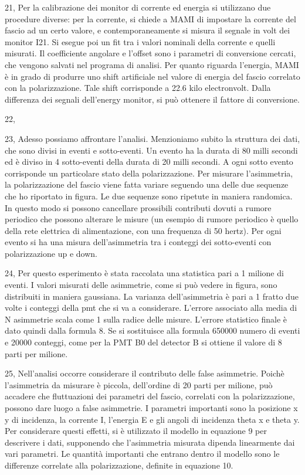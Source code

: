 \documentclass[11pt,a4paper]{article}
\begin{document}
\begin{list}{\textbf{slide}}{}
\item 21, Per la calibrazione dei monitor di corrente ed energia si utilizzano due procedure diverse: per la corrente, si chiede a MAMI di impostare la corrente del fascio ad un certo valore, e contemporaneamente si misura il segnale in volt dei monitor I21. Si esegue poi un fit tra i valori nominali della corrente e quelli misurati. Il coefficiente angolare e l'offset sono i parametri di conversione cercati, che vengono salvati nel programa di analisi. Per quanto riguarda l'energia, MAMI è in grado di produrre uno shift artificiale nel valore di energia del fascio correlato con la polarizzazione. Tale shift corrisponde a 22.6 kilo electronvolt. Dalla differenza dei segnali dell'energy monitor, si può ottenere il fattore di conversione.

\item 22,

\item 23, Adesso possiamo affrontare l'analisi. Menzioniamo subito la struttura dei dati, che sono divisi in eventi e sotto-eventi.  Un evento ha la durata di 80 milli secondi ed è diviso in 4 sotto-eventi della durata di 20 milli secondi. A ogni sotto evento corrisponde un particolare stato della polarizzazione. Per misurare l'asimmetria, la polarizzazione del fascio viene fatta variare seguendo una delle due sequenze che ho riportato in figura. Le due sequenze sono ripetute in maniera randomica. In questo modo si possono cancellare prossibili contributi dovuti a rumore periodico che possono alterare le misure (un esempio di rumore periodico è quello della rete elettrica di alimentazione, con una frequenza di 50 hertz). Per ogni evento si ha una misura dell'asimmetria tra i conteggi dei sotto-eventi con polarizzazione up e down.

\item 24, Per questo esperimento è stata raccolata una statistica pari a 1 milione di eventi. I valori misurati delle asimmetrie, come si può vedere in figura, sono distribuiti in maniera gaussiana. La varianza dell'asimmetria è pari a 1 fratto due volte i conteggi della pmt che si va a considerare. L'errore associato alla media di N asimmetrie scala come 1 sulla radice delle misure. L'errore statistico finale è dato quindi dalla formula 8. Se si sostituisce alla formula 650000 numero di eventi e 20000 conteggi, come per la PMT B0 del detector B si ottiene il valore di 8 parti per milione.

\item 25, Nell'analisi occorre considerare il contributo delle false asimmetrie. Poichè l'asimmetria da misurare è piccola, dell'ordine di 20 parti per milione, può accadere che fluttuazioni dei parametri del fascio, correlati con la polarizzazione, possono dare luogo a false asimmetrie. I parametri importanti sono la posizione x y di incidenza, la corrente I, l'energia E e gli angoli di incidenza theta x e theta y. Per considerare questi effetti, si è utilizzato il modello in equazione 9 per descrivere i dati, supponendo che l'asimmetria misurata dipenda linearmente dai vari parametri. Le quantità importanti che entrano dentro il modello sono le differenze correlate alla polarizzazione, definite in equazione 10.


\end{list}
\end{document}

